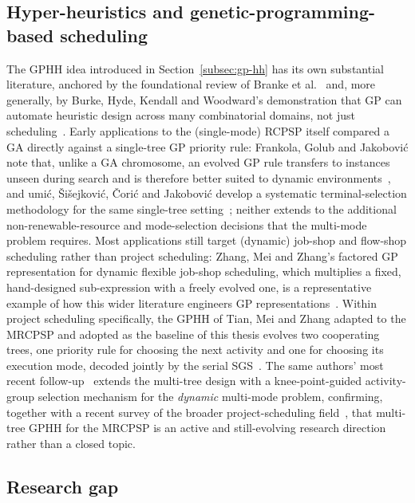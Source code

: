 \subsection{Hyper-heuristics and genetic-programming-based scheduling}
\label{subsec:gphh-related}

The GPHH idea introduced in Section~\ref{subsec:gp-hh} has its own substantial
literature, anchored by the foundational review of
Branke et al.~\cite{branke2016gphh} and, more generally, by Burke, Hyde,
Kendall and Woodward's demonstration that GP can automate heuristic design
across many combinatorial domains, not just scheduling~\cite{burke2012automating}.
Early applications to the (single-mode) RCPSP itself compared a GA directly
against a single-tree GP priority rule: Frankola, Golub and Jakobovi\'c note
that, unlike a GA chromosome, an evolved GP rule transfers to instances unseen
during search and is therefore better suited to dynamic
environments~\cite{frankola2008evolutionary}, and \DJ umi\'c, \v{S}i\v{s}ejkovi\'c,
\v{C}ori\'c and Jakobovi\'c develop a systematic terminal-selection methodology
for the same single-tree setting~\cite{dumic2018evolving}; neither extends to
the additional non-renewable-resource and mode-selection decisions that the
multi-mode problem requires. Most applications still target (dynamic) job-shop
and flow-shop scheduling rather than project scheduling: Zhang, Mei and
Zhang's factored GP representation for dynamic flexible job-shop scheduling,
which multiplies a fixed, hand-designed sub-expression with a freely evolved
one, is a representative example of how this wider literature engineers GP
representations~\cite{zhang2019new}. Within project scheduling specifically,
the GPHH of Tian, Mei and Zhang adapted to the MRCPSP and adopted as the
baseline of this thesis evolves two cooperating trees, one priority rule for choosing the next activity
and one for choosing its execution mode, decoded jointly by the serial
SGS~\cite{Tian2024GPHH}. The same authors' most recent
follow-up~\cite{tian2025multitree} extends the multi-tree design with a
knee-point-guided activity-group selection mechanism for the \emph{dynamic}
multi-mode problem, confirming, together with a recent survey of the
broader project-scheduling field~\cite{servranckx2024preface}, that
multi-tree GPHH for the MRCPSP is an active and still-evolving research
direction rather than a closed topic.

\subsection{Research gap}
\label{subsec:research-gap}

